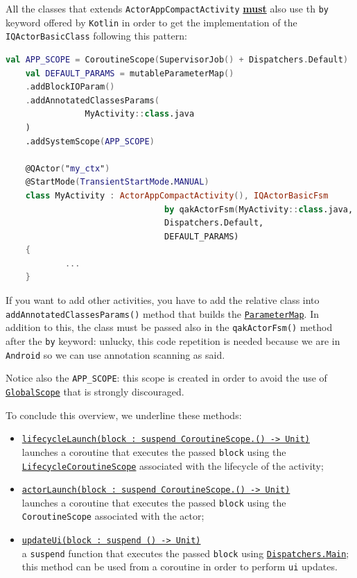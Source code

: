 All the classes that extends \texttt{ActorAppCompactActivity} \underline{\textbf{must}} also use th \texttt{by} keyword offered by \texttt{Kotlin} in order to get the implementation of the \texttt{IQActorBasicClass} following this pattern:
 
\begin{lstlisting}[language=Kotlin]
	val APP_SCOPE = CoroutineScope(SupervisorJob() + Dispatchers.Default)
	val DEFAULT_PARAMS = mutableParameterMap()
	.addBlockIOParam()
	.addAnnotatedClassesParams(
				MyActivity::class.java
	)
	.addSystemScope(APP_SCOPE)

	@QActor("my_ctx")
	@StartMode(TransientStartMode.MANUAL)
	class MyActivity : ActorAppCompactActivity(), IQActorBasicFsm
								by qakActorFsm(MyActivity::class.java,
								Dispatchers.Default,
								DEFAULT_PARAMS)
	{
			...
	}
\end{lstlisting}

If you want to add other activities, you have to add the relative class into \texttt{addAnnotatedClassesParams()} method that builds the \href{https://github.com/LM-96/QA-Extensions/blob/main/it.unibo.qakactor/src/main/kotlin/utils/ParameterUtils.kt}{\texttt{ParameterMap}}. In addition to this, the class must be passed also in the \texttt{qakActorFsm()} method after the \texttt{by} keyword: unlucky, this code repetition is needed because we are in \texttt{Android} so we can use annotation scanning as said.

Notice also the \texttt{APP\_SCOPE}:  this scope is created in order to avoid the use of \href{https://kotlinlang.org/api/kotlinx.coroutines/kotlinx-coroutines-core/kotlinx.coroutines/-global-scope/}{\texttt{GlobalScope}} that is strongly discouraged.

To conclude this overview, we underline these methods:
\begin{itemize}
	\item \underline{\texttt{lifecycleLaunch(block : suspend CoroutineScope.() -> Unit)}}\\
	launches a coroutine that executes the passed \texttt{block} using the \href{https://developer.android.com/reference/kotlin/androidx/lifecycle/LifecycleCoroutineScope}{\texttt{LifecycleCoroutineScope}} associated with the lifecycle of the activity;
	
	\item \underline{\texttt{actorLaunch(block : suspend CoroutineScope.() -> Unit)}}\\
	launches a coroutine that executes the passed \texttt{block} using the \texttt{CoroutineScope} associated with the actor;
	
	\item \underline{\texttt{updateUi(block : suspend () -> Unit)}}\\
	a \texttt{suspend} function that executes the passed \texttt{block} using \href{https://developer.android.com/kotlin/coroutines/coroutines-adv#main-safety}{\texttt{Dispatchers.Main}}; this method can be used from a coroutine in order to perform \texttt{ui} updates.
\end{itemize}


